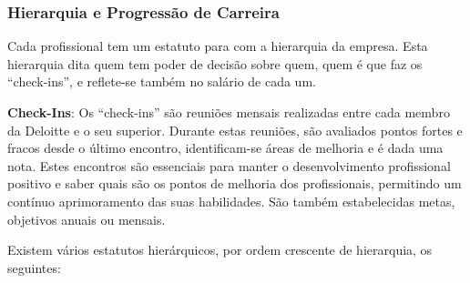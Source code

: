         \subsubsection{Hierarquia e Progressão de Carreira}

            Cada profissional tem um estatuto para com a hierarquia da empresa. Esta hierarquia dita quem tem poder de decisão sobre quem, quem é que faz os ``check-ins'', e reflete-se também no salário de cada um.

            \textbf{Check-Ins}: Os ``check-ins'' são reuniões mensais realizadas entre cada membro da Deloitte e o seu superior. Durante estas reuniões, são avaliados pontos fortes e fracos desde o último encontro, identificam-se áreas de melhoria e é dada uma nota. Estes encontros são essenciais para manter o desenvolvimento profissional positivo e saber quais são os pontos de melhoria dos profissionais, permitindo um contínuo aprimoramento das suas habilidades. São também estabelecidas metas, objetivos anuais ou mensais.
                        
            Existem vários estatutos hierárquicos, por ordem crescente de hierarquia, os seguintes:

